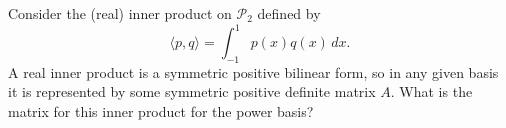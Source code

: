 \documentclass[12pt, leqno]{article}
\begin{document}

Consider the (real) inner product on $\mathcal{P}_2$ defined by
\[
  \langle p, q \rangle = \int_{-1}^1 p(x) q(x) \, dx.
\]
A real inner product is a symmetric positive bilinear form,
so in any given basis it is represented by some symmetric positive
definite matrix $A$.  What is the matrix for this inner product
for the power basis?
\end{document}
